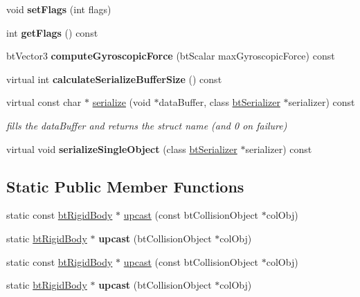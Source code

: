 \begin{DoxyCompactItemize}
void {\bfseries set\+Flags} (int flags)
\item 
\mbox{\label{classbtRigidBody_a2ac6c5303690999eaf184882c147338b}} 
int {\bfseries get\+Flags} () const
\item 
\mbox{\label{classbtRigidBody_a82cb76832e357f3ed71996f6717d8064}} 
bt\+Vector3 {\bfseries compute\+Gyroscopic\+Force} (bt\+Scalar max\+Gyroscopic\+Force) const
\item 
\mbox{\label{classbtRigidBody_ae281b8937553e623e850d7b4568cae60}} 
virtual int {\bfseries calculate\+Serialize\+Buffer\+Size} () const
\item 
\mbox{\label{classbtRigidBody_aa6d31dbce90301b2b78008a38dd0330d}} 
virtual const char $\ast$ \hyperlink{classbtRigidBody_aa6d31dbce90301b2b78008a38dd0330d}{serialize} (void $\ast$data\+Buffer, class \hyperlink{classbtSerializer}{bt\+Serializer} $\ast$serializer) const
\begin{DoxyCompactList}\small\item\em fills the data\+Buffer and returns the struct name (and 0 on failure) \end{DoxyCompactList}\item 
\mbox{\label{classbtRigidBody_ae69696d696a798f2d2c65e3154e5530a}} 
virtual void {\bfseries serialize\+Single\+Object} (class \hyperlink{classbtSerializer}{bt\+Serializer} $\ast$serializer) const
\end{DoxyCompactItemize}
\subsection*{Static Public Member Functions}
\begin{DoxyCompactItemize}
\item 
static const \hyperlink{classbtRigidBody}{bt\+Rigid\+Body} $\ast$ \hyperlink{classbtRigidBody_a59077fce3d2efd193a3fd7d7de2c97e8}{upcast} (const bt\+Collision\+Object $\ast$col\+Obj)
\item 
\mbox{\label{classbtRigidBody_a39c3becb4cec6c3c30359444f6f64420}} 
static \hyperlink{classbtRigidBody}{bt\+Rigid\+Body} $\ast$ {\bfseries upcast} (bt\+Collision\+Object $\ast$col\+Obj)
\item 
static const \hyperlink{classbtRigidBody}{bt\+Rigid\+Body} $\ast$ \hyperlink{classbtRigidBody_a59077fce3d2efd193a3fd7d7de2c97e8}{upcast} (const bt\+Collision\+Object $\ast$col\+Obj)
\item 
\mbox{\label{classbtRigidBody_a39c3becb4cec6c3c30359444f6f64420}} 
static \hyperlink{classbtRigidBody}{bt\+Rigid\+Body} $\ast$ {\bfseries upcast} (bt\+Collision\+Object $\ast$col\+Obj)
\end{DoxyCompactItemize}
